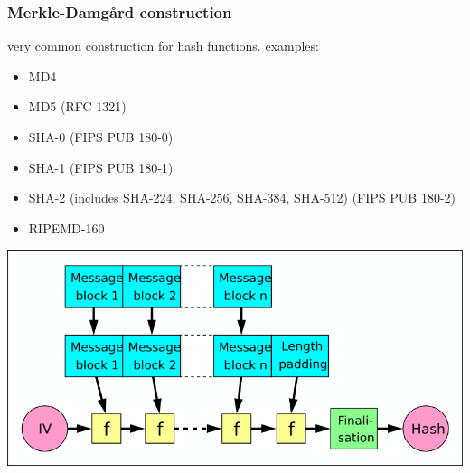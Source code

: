 
\begin{frame}
\frametitle{Merkle-Damgård construction}
	very common construction for hash functions.
	examples:
	\begin{itemize}
		\item MD4
		\item MD5 (RFC 1321)
		\item SHA-0 (FIPS PUB 180-0) 
		\item SHA-1 (FIPS PUB 180-1) 
		\item SHA-2 (includes SHA-224, SHA-256, SHA-384, SHA-512) (FIPS PUB 180-2)
		\item RIPEMD-160
	\end{itemize}
	\begin{center}\includegraphics[scale=0.35]{Merkle-Damgard_hash_big}\end{center}
\end{frame}












